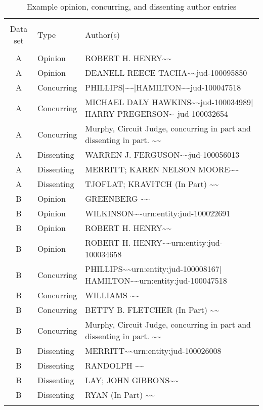 \documentclass[10pt, letterpaper]{article}
\begin{document}
\begin{spacing}{1.0}
\begin{table}[H]
    \centering
    \caption{Example opinion, concurring, and dissenting author entries}
    \small
    \begin{tabular}{cll}
        \hline\\[-6pt]
        Data set & Type & Author(s)\\[4pt]
        \hline\\[-6pt]
        A & Opinion & ROBERT H. HENRY\textasciitilde\textasciitilde\\
        A & Opinion & DEANELL REECE TACHA\textasciitilde\textasciitilde jud-100095850\\
        A & Concurring & PHILLIPS$\vert$\textasciitilde\textasciitilde|HAMILTON\textasciitilde\textasciitilde jud-100047518\\
        A & Concurring & MICHAEL DALY HAWKINS\textasciitilde\textasciitilde jud-100034989$\vert$HARRY PREGERSON\textasciitilde\ jud-100032654\\
        A & Concurring & Murphy, Circuit Judge, concurring in part and dissenting in part.  \textasciitilde\textasciitilde\\
        A & Dissenting & WARREN J. FERGUSON\textasciitilde\textasciitilde jud-100056013\\
        A & Dissenting & MERRITT; KAREN NELSON MOORE\textasciitilde\textasciitilde \\
        A & Dissenting & TJOFLAT; KRAVITCH (In Part) \textasciitilde\textasciitilde\\
        B & Opinion & GREENBERG \textasciitilde\textasciitilde\\
        B & Opinion & WILKINSON\textasciitilde\textasciitilde urn:entity:jud-100022691\\
        B & Opinion & ROBERT H. HENRY\textasciitilde\textasciitilde\\
        B & Opinion & ROBERT H. HENRY\textasciitilde\textasciitilde urn:entity:jud-100034658\\
        B & Concurring & PHILLIPS\textasciitilde\textasciitilde urn:entity:jud-100008167$\vert$HAMILTON\textasciitilde\textasciitilde urn:entity:jud-100047518\\
        B & Concurring & WILLIAMS \textasciitilde\textasciitilde\\
        B & Concurring & BETTY B. FLETCHER (In Part) \textasciitilde\textasciitilde\\
        B & Concurring & Murphy, Circuit Judge, concurring in part and dissenting in part.  \textasciitilde\textasciitilde\\
        B & Dissenting & MERRITT\textasciitilde\textasciitilde urn:entity:jud-100026008\\
        B & Dissenting & RANDOLPH \textasciitilde\textasciitilde\\
        B & Dissenting & LAY; JOHN GIBBONS\textasciitilde\textasciitilde\\
        B & Dissenting & RYAN (In Part) \textasciitilde\textasciitilde\\[4pt]
        \hline\\
    \end{tabular}
    \label{tab:exampleOpinionJudge}
\end{table}


\end{spacing}
\end{document}
